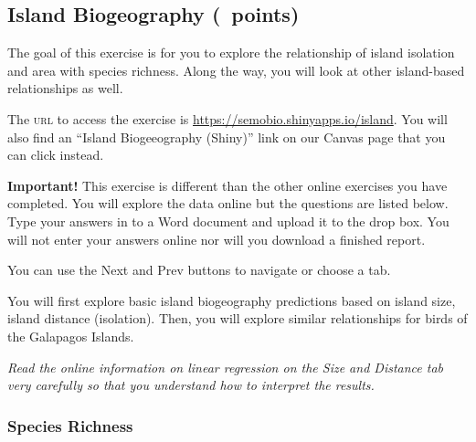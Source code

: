 \documentclass[11pt, addpoints]{exam}
\begin{document}
\subsection*{Island Biogeography (\numpoints~points)}
The goal of this exercise is for you to explore the relationship of
island isolation and area with species richness. Along the way, you will
look at other island-based relationships as well.

The \textsc{url} to access the exercise is \url{https://semobio.shinyapps.io/island}. You will also find an “Island Biogeeography (Shiny)” link on our Canvas page that you can click instead.

\textbf{Important!} This exercise is different than the other online exercises you have completed. You will explore the data online but
the questions are listed below. Type your answers in to a Word document
and upload it to the drop box. You will not enter your answers online nor will you download a finished report.

You can use the Next and Prev buttons to navigate or choose a tab.

You will first explore basic island biogeography predictions based on island size, island distance (isolation). Then, you will explore similar relationships for birds of the Galapagos Islands.

\textit{Read the online information on linear regression on the Size and Distance tab very carefully so 
that you understand how to interpret the results.}

\subsubsection*{Species Richness}
\end{document}
